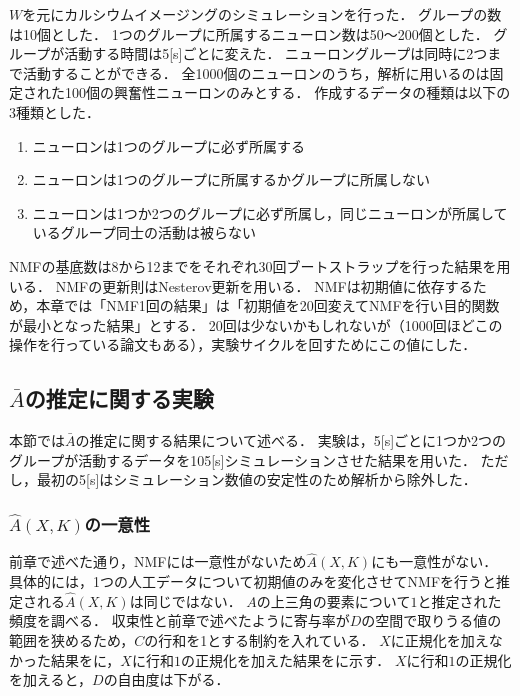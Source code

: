 $W$を元にカルシウムイメージングのシミュレーションを行った．
グループの数は10個とした．
1つのグループに所属するニューロン数は50〜200個とした．
グループが活動する時間は5[s]ごとに変えた．
ニューロングループは同時に2つまで活動することができる．
全1000個のニューロンのうち，解析に用いるのは固定された100個の興奮性ニューロンのみとする．
作成するデータの種類は以下の3種類とした．

\begin{enumerate}
  \item ニューロンは1つのグループに必ず所属する
  \item ニューロンは1つのグループに所属するかグループに所属しない
  \item ニューロンは1つか2つのグループに必ず所属し，同じニューロンが所属しているグループ同士の活動は被らない
\end{enumerate}

NMFの基底数は8から12までをそれぞれ30回ブートストラップを行った結果を用いる．
NMFの更新則はNesterov更新\cite{Guan2012}を用いる．
NMFは初期値に依存するため，本章では「NMF1回の結果」は「初期値を20回変えてNMFを行い目的関数が最小となった結果」とする．
20回は少ないかもしれないが（1000回ほどこの操作を行っている論文もある），実験サイクルを回すためにこの値にした．

\subsection{$\bar{A}$の推定に関する実験}
本節では$\bar{A}$の推定に関する結果について述べる．
実験は，5[s]ごとに1つか2つのグループが活動するデータを105[s]シミュレーションさせた結果を用いた．
ただし，最初の5[s]はシミュレーション数値の安定性のため解析から除外した．

\subsubsection{$\hat{A}(X,K)$の一意性}
前章で述べた通り，NMFには一意性がないため$\hat{A}(X,K)$にも一意性がない．
具体的には，1つの人工データについて初期値のみを変化させてNMFを行うと推定される$\hat{A}(X,K)$は同じではない．
$A$の上三角の要素について$1$と推定された頻度を調べる．
収束性と前章で述べたように寄与率が$D$の空間で取りうる値の範囲を狭めるため，$C$の行和を1とする制約を入れている．
$X$に正規化を加えなかった結果をに，$X$に行和$1$の正規化を加えた結果をに示す．
$X$に行和$1$の正規化を加えると，$D$の自由度は下がる．

